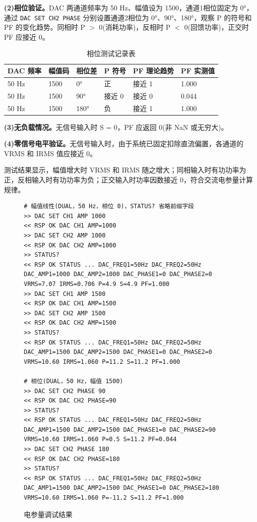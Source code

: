 \documentclass[UTF8,a4paper,zihao=-4,fontset=macnew]{ctexart}
\begin{document}
\textbf{(2)相位验证。}DAC 两通道频率为 50 Hz、幅值设为 1500，通道1相位固定为 0°，通过 \texttt{DAC SET CH2 PHASE} 分别设置通道2相位为 0°、90°、180°，观察 P 的符号和 PF 的变化趋势。同相时 P $>$ 0(消耗功率)，反相时 P $<$ 0(回馈功率)，正交时 PF 应接近 0。

\begin{table}[H]
\centering
{}
\caption{相位测试记录表}
\label{tab:phase-test}
\begin{tabular}{llllll}
\toprule
DAC 频率 & 幅值码 & 相位差 & P 符号 & PF 理论趋势 & PF 实测值 \\
\midrule
50 Hz & 1500 & 0° & 正 & 接近 1 & 1.000 \\
50 Hz & 1500 & 90° & 接近 0 & 接近 0 & 0.044 \\
50 Hz & 1500 & 180° & 负 & 接近 1 & 1.000 \\
\bottomrule
\end{tabular}
\end{table}

\textbf{(3)无负载情况。}无信号输入时 S = 0，PF 应返回 0(非 NaN 或无穷大)。

\textbf{(4)零信号电平验证。}无信号输入时，由于系统已固定扣除直流偏置，各通道的 VRMS 和 IRMS 值应接近 0。

测试结果显示，幅值增大时 VRMS 和 IRMS 随之增大；同相输入时有功功率为正，反相输入时有功功率为负；正交输入时功率因数接近 0，符合交流电参量计算规律。

\begin{figure}[H]
\centering
\begin{lstlisting}[style=serialterm]
# 幅值线性(DUAL，50 Hz，相位 0)，STATUS? 省略前缀字段
>> DAC SET CH1 AMP 1000
<< RSP OK DAC CH1 AMP=1000
>> DAC SET CH2 AMP 1000
<< RSP OK DAC CH2 AMP=1000
>> STATUS?
<< RSP OK STATUS ... DAC_FREQ1=50Hz DAC_FREQ2=50Hz DAC_AMP1=1000 DAC_AMP2=1000 DAC_PHASE1=0 DAC_PHASE2=0 VRMS=7.07 IRMS=0.706 P=4.9 S=4.9 PF=1.000
>> DAC SET CH1 AMP 1500
<< RSP OK DAC CH1 AMP=1500
>> DAC SET CH2 AMP 1500
<< RSP OK DAC CH2 AMP=1500
>> STATUS?
<< RSP OK STATUS ... DAC_FREQ1=50Hz DAC_FREQ2=50Hz DAC_AMP1=1500 DAC_AMP2=1500 DAC_PHASE1=0 DAC_PHASE2=0 VRMS=10.60 IRMS=1.060 P=11.2 S=11.2 PF=1.000

# 相位(DUAL，50 Hz，幅值 1500)
>> DAC SET CH2 PHASE 90
<< RSP OK DAC CH2 PHASE=90
>> STATUS?
<< RSP OK STATUS ... DAC_FREQ1=50Hz DAC_FREQ2=50Hz DAC_AMP1=1500 DAC_AMP2=1500 DAC_PHASE1=0 DAC_PHASE2=90 VRMS=10.60 IRMS=1.060 P=0.5 S=11.2 PF=0.044
>> DAC SET CH2 PHASE 180
<< RSP OK DAC CH2 PHASE=180
>> STATUS?
<< RSP OK STATUS ... DAC_FREQ1=50Hz DAC_FREQ2=50Hz DAC_AMP1=1500 DAC_AMP2=1500 DAC_PHASE1=0 DAC_PHASE2=180 VRMS=10.60 IRMS=1.060 P=-11.2 S=11.2 PF=1.000
\end{lstlisting}
\caption{电参量调试结果}
\label{fig:debug-calc}
\end{figure}
\end{document}
